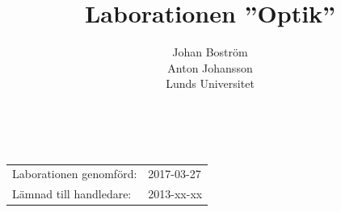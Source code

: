 \documentclass[a4paper]{article}
\title{Laborationen ”Optik”}
\author{Johan Boström\\Anton Johansson\\Lunds Universitet}
\makeatletter
\renewcommand*\maketitle{
  {
    \begin{center}
      {\huge\bfseries \@title}\\
      \vspace{5mm}
      {\large \@author}
    \end{center}
    \vspace{2mm}
  }
}
\makeatother
\begin{document}
\maketitle


\begin{abstract}
\end{abstract}

\vspace{2mm}

\hspace{-3mm}
\begin{tabular}{ll}
Laborationen genomförd: &	2017-03-27 \\
Lämnad till handledare: &	2013-xx-xx \\
\end{tabular}

\vspace{3mm}
\end{document}
